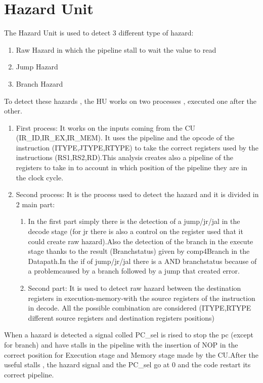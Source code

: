 \chapter{Hazard Unit}
\label{Hazard Unit}

The Hazard Unit is used to detect 3 different type of hazard: 
\begin{enumerate} 
    \item Raw Hazard in which the pipeline stall to wait the value to read
    \item Jump Hazard 
    \item Branch Hazard
\end{enumerate}

To detect these hazards , the HU works on two processes , executed one after the other.
\begin{enumerate} 
    \item First process: It works on the inputs coming from the CU (IR\_ID,IR\_EX,IR\_MEM). It uses the pipeline and the opcode of the instruction (ITYPE,JTYPE,RTYPE) to take the correct registers used by the instructions (RS1,RS2,RD).This analysis creates also a pipeline of the registers to take in to account in which position of the pipeline they are in the clock cycle.
    \item Second process: It is the process used to detect the hazard and it is divided in 2 main part:
    \begin{enumerate}  
        \item In the first part simply there is the detection of a jump/jr/jal in the decode stage (for jr there is also a control on the register used that it could create raw hazard).Also the detection of the branch in the execute stage thanks to the result (Branchstatus) given by comp4Branch in the Datapath.In the if of jump/jr/jal there is a AND branchstatus because of a problemcaused by a branch followed by a jump that created error.
        \item Second part: It is used to detect raw hazard between the destination registers in execution-memory-with the source registers of the instruction in decode. All the possible combination are considered (ITYPE,RTYPE different source registers and destination registers positions)
    \end{enumerate}
\end{enumerate}

When a hazard is detected a signal colled PC\_sel is rised to stop the pc (except for branch) and have stalls in the pipeline with the insertion of NOP in the correct position for Execution stage and Memory stage made by the CU.After the useful stalls , the hazard signal and the PC\_sel go at 0 and the code restart its correct pipeline.